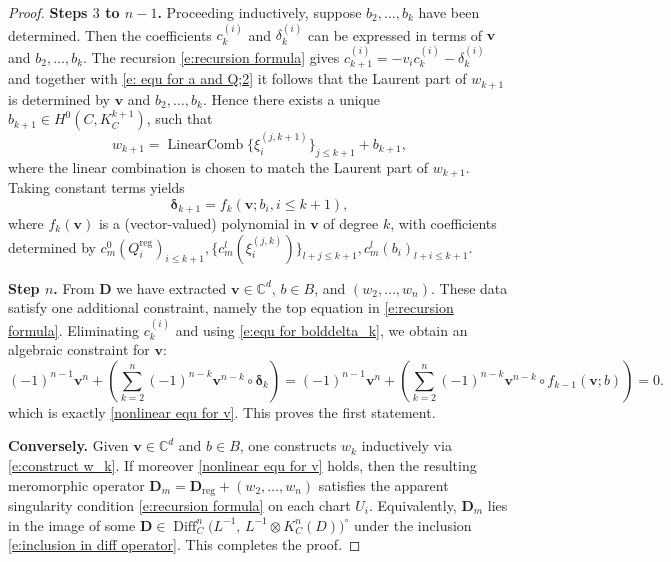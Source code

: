 \documentclass[twoside, 11pt]{article}
\numberwithin{equation}{section}
\theoremstyle{theorem}
\numberwithin{theorem}{section}
\theoremstyle{definition}
\begin{document}
\begin{proof}
\medskip
\noindent
\textbf{Steps $3$ to $n-1$.}  
Proceeding inductively, suppose $b_2,\dots,b_k$ have been determined. Then the coefficients $c^{(i)}_k$ and $\delta^{(i)}_k$ can be expressed in terms of $\boldsymbol v$ and $b_2,\dots,b_k$.  The recursion \eqref{e:recursion formula} gives $c^{(i)}_{k+1} = -v_i c^{(i)}_{k}-\delta^{(i)}_{k}$ and together with \eqref{e: equ for a and Q;2} it follows that the Laurent part of $w_{k+1}$ is determined by $\boldsymbol v$ and $b_2,\dots,b_k$. Hence there exists a unique $b_{k+1} \in H^0\left(C, K_C^{k+1}\right)$, such that 
\begin{equation}\label{e:construct w_k}
w_{k+1}=\operatorname{Linear Comb}\{\xi_i^{(j,k+1)}\}_{j \leq k+1} + b_{k+1},
\end{equation}
where the linear combination is chosen to match the Laurent part of $w_{k+1}$.
Taking constant terms yields
\begin{equation}\label{e:equ for bolddelta_k}
\boldsymbol{\delta}_{k+1} = f_k(\boldsymbol v;b_i,i \leq k+1),
\end{equation}
where \(f_k(\boldsymbol v)\) is a (vector-valued) polynomial in \(\boldsymbol v\) of degree $k$, with coefficients determined by
\(c^0_m(Q^{\mathrm{reg}}_i)_{i \leq k+1},\{c^l_m(\xi_i^{(j,k)})\}_{l+j \leq k+1}, c^l_m(b_i)_{l+i\leq k+1}\).


\medskip
\noindent
\textbf{Step $n$.} 
From $\mathbf D$ we have extracted $\boldsymbol v\in \mathbb{C}^d$, $b\in B$, and $(w_2,\dots,w_n)$. These data satisfy one additional constraint, namely the top equation in \eqref{e:recursion formula}. Eliminating $c_k^{(i)}$ and using \eqref{e:equ for bolddelta_k}, we obtain an algebraic constraint for $\boldsymbol v$:
$$
(-1)^{n-1} \boldsymbol v^n + \left(\sum_{k=2}^{n} (-1)^{n-k}  \boldsymbol v^{n-k} \circ \boldsymbol{\delta}_{k}  \right) = (-1)^{n-1} \boldsymbol v^n + \left(\sum_{k=2}^{n} (-1)^{n-k}  \boldsymbol v^{n-k} \circ f_{k-1}(\boldsymbol v;b)  \right) = 0.
$$
which is exactly \eqref{nonlinear equ for v}. This proves the first statement.

\noindent\textbf{Conversely.}
Given $\boldsymbol v\in \mathbb{C}^d$ and $b\in B$, one constructs $w_k$ inductively via \eqref{e:construct w_k}. If moreover \eqref{nonlinear equ for v} holds, then the resulting meromorphic operator
\(
\mathbf D_m=\mathbf D_{\mathrm{reg}}+(w_2,\dots,w_n)
\)
satisfies the apparent singularity condition \eqref{e:recursion formula} on each chart $U_i$. Equivalently, $\mathbf D_m$ lies in the image of some
\(
\mathbf D\in \operatorname{Diff}_C^{n} \bigl(L^{-1},\,L^{-1}\otimes K_C^{n}(D)\bigr)^{\circ}
\)
under the inclusion \eqref{e:inclusion in diff operator}. This completes the proof.
\end{proof}
\end{document}
